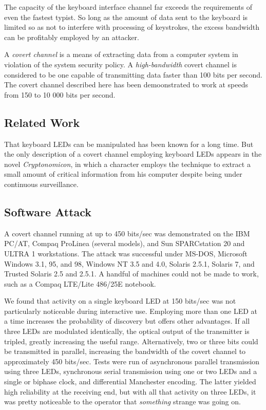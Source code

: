 \documentclass[twocolumn]{article}
\begin{document}
{The capacity of the keyboard interface channel far exceeds the requirements of even the fastest typist.  So long as the amount of data sent to the keyboard is limited so as not to interfere with processing of keystrokes, the excess bandwidth can be profitably employed by an attacker.

A {\it covert channel} is a means of extracting data from a computer system in violation of the system security policy. \cite{lampson}  A {\it high-bandwidth} covert channel is considered to be one capable of transmitting data faster than 100 bits per second. \cite{orange_book, common_criteria} The covert channel described here has been demoonstrated to work at speeds from 150 to 10 000 bits per second.

\subsection{Related Work}

That keyboard LEDs can be manipulated has been known for a long time.  But the only description of a covert channel employing keyboard LEDs appears in the novel {\it Cryptonomicon}, in which a character employs the technique to extract a small amount of critical information from his computer despite being under continuous surveillance. \cite{cryptonomicon}

\subsection{Software Attack}

A covert channel running at up to 450 bits/sec was demonstrated on the IBM PC/AT, Compaq ProLinea (several models), and Sun SPARCstation 20 and ULTRA 1 workstations.  The attack was successful under MS-DOS, Microsoft Windows 3.1, 95, and 98, Windows NT 3.5 and 4.0, Solaris 2.5.1, Solaris 7, and Trusted Solaris 2.5 and 2.5.1.  A handful of machines could not be made to work, such as a Compaq LTE/Lite 486/25E notebook.

We found that activity on a single keyboard LED at 150 bits/sec was not particularly noticeable during interactive use.  Employing more than one LED at a time increases the probability of discovery but offers other advantages.  If all three LEDs are modulated identically, the optical output of the transmitter is tripled, greatly increasing the useful range.  Alternatively, two or three bits could be transmitted in parallel, increasing the bandwidth of the covert channel to approximately 450 bits/sec.  Tests were run of asynchronous parallel transmission using three LEDs, synchronous serial transmission using one or two LEDs and a single or biphase clock, and differential Manchester encoding.  The latter yielded high reliability at the receiving end, but with all that activity on three LEDs, it was pretty noticeable to the operator that {\it something} strange was going on.

}
\end{document}
